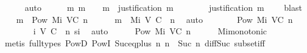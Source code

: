 \begin{isabellebody}
\ \ \ \ \isamarkupfalse%
\ auto\isanewline
\ \ \isamarkupfalse%
\ \isamarkupfalse%
\ {\isachardoublequoteopen}{\isasymAnd}m{\isacharprime}{\isachardot}\ m{\isacharprime}\ {\isasymin}\ {\isasymsigma}\ {\isasymunion}\ {\isacharbraceleft}m{\isacharbraceright}\ {\isasymLongrightarrow}\ justification\ m\ {\isasymsubseteq}\ {\isasymsigma}{\isachardoublequoteclose}\isanewline
\ \ \ \ \isamarkupfalse%
\ {\isacartoucheopen}justification\ m\ {\isasymsubseteq}\ {\isasymsigma}{\isacartoucheclose}\ \isamarkupfalse%
\ blast\isanewline
\isanewline
\ \ \isamarkupfalse%
\ {\isachardoublequoteopen}{\isacharbraceleft}m{\isacharbraceright}\ {\isasymin}\ Pow\ {\isacharparenleft}Mi\ {\isacharparenleft}V{\isacharcomma}C{\isacharcomma}{\isasymepsilon}{\isacharparenright}\ n{\isacharparenright}{\isachardoublequoteclose}\isanewline
\ \ \ \ \isamarkupfalse%
\ {\isacartoucheopen}m\ {\isasymin}\ Mi\ {\isacharparenleft}V{\isacharcomma}\ C{\isacharcomma}\ {\isasymepsilon}{\isacharparenright}\ n{\isacartoucheclose}\ \isamarkupfalse%
\ auto\isanewline
\ \ \isamarkupfalse%
\ \isamarkupfalse%
\ {\isachardoublequoteopen}{\isasymsigma}\ {\isasymin}\ Pow\ {\isacharparenleft}Mi\ {\isacharparenleft}V{\isacharcomma}C{\isacharcomma}{\isasymepsilon}{\isacharparenright}\ {\isacharparenleft}n{\isacharminus}{}{\isacharparenright}{\isacharparenright}{\isachardoublequoteclose}\isanewline
\ \ \ \ \isamarkupfalse%
\ {\isacartoucheopen}{\isasymsigma}\ {\isasymin}\ {\isasymSigma}i\ {\isacharparenleft}V{\isacharcomma}\ C{\isacharcomma}\ {\isasymepsilon}{\isacharparenright}\ n{\isacartoucheclose}\ si\ \isamarkupfalse%
\ auto\isanewline
\ \ \isamarkupfalse%
\ {\isachardoublequoteopen}{\isasymsigma}\ {\isasymin}\ Pow\ {\isacharparenleft}Mi\ {\isacharparenleft}V{\isacharcomma}C{\isacharcomma}{\isasymepsilon}{\isacharparenright}\ n{\isacharparenright}{\isachardoublequoteclose}\isanewline
\ \ \ \ \isamarkupfalse%
\ Mi{\isacharunderscore}monotonic\isanewline
\ \ \ \ \isamarkupfalse%
\ {\isacharparenleft}metis\ {\isacharparenleft}full{\isacharunderscore}types{\isacharparenright}\ PowD\ PowI\ Suc{\isacharunderscore}eq{\isacharunderscore}plus{}\ {\isacartoucheopen}{\isasymexists}n{\isacharprime}{\isachardot}\ n\ {\isacharequal}\ Suc\ n{\isacharprime}{\isacartoucheclose}\ diff{\isacharunderscore}Suc{\isacharunderscore}{}\ subset{\isacharunderscore}iff{\isacharparenright}\isanewline

\end{isabellebody}
